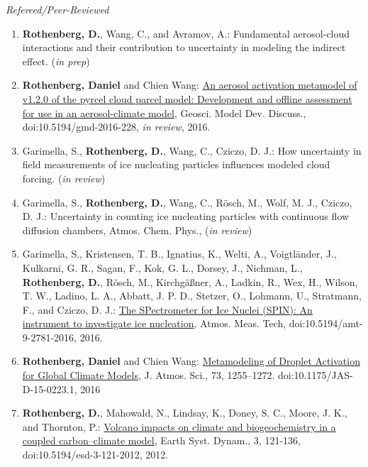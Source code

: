 \documentclass[11pt,letterpaper]{article}
\newcommand{\mhead}[1]{\leavevmode\marginpar{\sffamily\footnotesize #1}}
\begin{document}
\bigskip
\mhead{Publications}%
\emph{Refereed/Peer-Reviewed} \newline
\begin{enumerate}[itemindent=-10pt]

 \item \textbf{Rothenberg, D.}, Wang, C., and Avramov, A.: Fundamental aerosol-cloud interactions and their contribution to uncertainty in modeling the indirect effect. (\emph{in prep})

 \item \textbf{Rothenberg, Daniel} and Chien Wang: \href{http://www.geosci-model-dev-discuss.net/gmd-2016-228/}{An aerosol activation metamodel of v1.2.0 of the pyrcel cloud parcel model: Development and offline assessment for use in an aerosol-climate model}, Geosci. Model Dev. Discuss., doi:10.5194/gmd-2016-228, \emph{in review}, 2016.

 \item Garimella, S., \textbf{Rothenberg, D.}, Wang, C., Cziczo, D. J.: How uncertainty in field measurements of ice nucleating particles influences modeled cloud forcing. (\emph{in review})

 \item Garimella, S., \textbf{Rothenberg, D.}, Wang, C., Rösch, M., Wolf, M. J., Cziczo, D. J.: Uncertainty in counting ice nucleating particles with continuous flow diffusion chambers, Atmos. Chem. Phys., (\emph{in review})

 \item Garimella, S., Kristensen, T. B., Ignatius, K., Welti, A., Voigtländer, J., Kulkarni, G. R., Sagan, F., Kok, G. L., Dorsey, J., Nichman, L., \textbf{Rothenberg, D.}, Rösch, M., Kirchgäßner, A., Ladkin, R., Wex, H., Wilson, T. W., Ladino, L. A., Abbatt, J. P. D., Stetzer, O., Lohmann, U., Stratmann, F., and Cziczo, D. J.: \href{http://www.atmos-meas-tech.net/9/2781/2016/amt-9-2781-2016.html}{The SPectrometer for Ice Nuclei (SPIN): An instrument to investigate ice nucleation}, Atmos. Meas. Tech, doi:10.5194/amt-9-2781-2016, 2016.

 \item \textbf{Rothenberg, Daniel} and Chien Wang: \href{http://dx.doi.org/10.1175/JAS-D-15-0223.1}{Metamodeling of Droplet Activation for Global Climate Models}, J. Atmos. Sci., 73, 1255–1272. doi:10.1175/JAS-D-15-0223.1, 2016

 \item \textbf{Rothenberg, D.}, Mahowald, N., Lindsay, K., Doney, S. C., Moore, J. K., and Thornton, P.: \href{http://dx.doi.org/10.5194/esd-3-121-2012}{Volcano impacts on climate and biogeochemistry in a coupled carbon–climate model}, Earth Syst. Dynam., 3, 121-136, doi:10.5194/esd-3-121-2012, 2012.


\end{enumerate}
\end{document}
